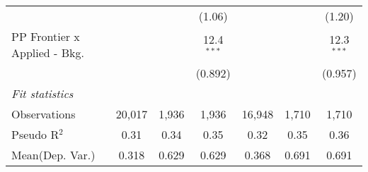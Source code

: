 \begin{tabular}{lcccccc}
                                  &                &               & (1.06)        &               &               & (1.20)\\   
   PP Frontier x Applied - Bkg.   &                &               & 12.4$^{***}$  &               &               & 12.3$^{***}$\\   
                                  &                &               & (0.892)       &               &               & (0.957)\\   
   \midrule
   \emph{Fit statistics}\\
   Observations                   & 20,017         & 1,936         & 1,936         & 16,948        & 1,710         & 1,710\\  
   Pseudo R$^2$                   & 0.31           & 0.34          & 0.35          & 0.32          & 0.35          & 0.36\\  
Mean(Dep. Var.) & 0.318 & 0.629 & 0.629 & 0.368 & 0.691 & 0.691 \\
   

\end{tabular}
